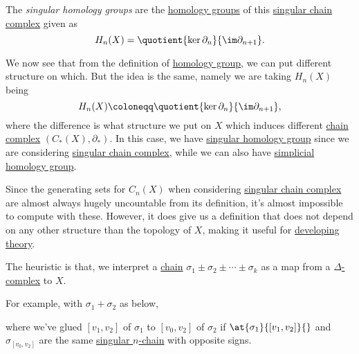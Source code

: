 \begin{definition}\label{def:singular-homology-group}
	The \emph{singular homology groups} are the \hyperref[def:homology-group]{homology groups} of this \hyperref[def:singular-chain-complex]{singular chain complex} given as
	\[
		H_n(X) = \quotient{\ker \partial_n}{\im \partial_{n + 1}}.
	\]
\end{definition}
\begin{remark}
	We now see that from the definition of \hyperref[def:homology-group]{homology group}, we can put different structure on which. But the idea is the same, namely we are taking \(H_{n} (X)\) being
	\[
		H_n(X) \coloneqq \quotient{\ker \partial _n}{\im \partial _{n+1}},
	\]
	where the difference is what structure we put on \(X\) which induces different \hyperref[def:chain-complex]{chain complex} \((C_{\ast} (X), \partial _\ast)\). In this case, we have \hyperref[def:singular-homology-group]{singular homology group} since we are considering \hyperref[def:singular-chain-complex]{singular chain complex}, while we can also have \hyperref[def:simplicial-homology-group]{simplicial homology group}.
\end{remark}

Since the generating sets for \(C_{n} (X)\) when considering \hyperref[def:singular-chain-complex]{singular chain complex} are almost always hugely uncountable from its definition, it's almost impossible to compute with these. However, it does give us a definition that does not depend on any other structure than the topology of \(X\), making it useful for \underline{developing theory}.

\begin{note}
	The heuristic is that, we interpret a \hyperref[def:chain-group]{chain} \(\sigma_1 \pm \sigma_2 \pm \cdots \pm \sigma_k\) as a map from a \hyperref[def:delta-complex]{\(\Delta\)-complex} to \(X\).

	\begin{eg}
		For example, with \(\sigma_1 + \sigma_2\) as below,
		\begin{figure}[H]
			\centering
			\label{fig:note:chain-as-a-map}
		\end{figure}
		where we've glued \([v_1, v_2]\) of \(\sigma_1\) to \([v_0, v_2]\) of \(\sigma_2\) if \(\at{\sigma_1}{[v_1, v_2]}{}\) and \(\sigma_{[v_0, v_2]}\) are the same \hyperref[def:singular-chain-group]{singular \(n\)-chain} with opposite signs.
	\end{eg}
\end{note}

